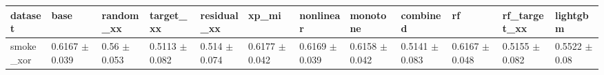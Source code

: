 \begin{tabular}{llllllllllll}
\toprule
dataset & base & random\_xx & target\_xx & residual\_xx & xp\_mi & nonlinear & monotone & combined & rf & rf\_target\_xx & lightgbm \\
\midrule
smoke\_xor & 0.6167 $\pm$ 0.039 & 0.56 $\pm$ 0.053 & 0.5113 $\pm$ 0.082 & 0.514 $\pm$ 0.074 & 0.6177 $\pm$ 0.042 & 0.6169 $\pm$ 0.039 & 0.6158 $\pm$ 0.042 & 0.5141 $\pm$ 0.083 & 0.6167 $\pm$ 0.048 & 0.5155 $\pm$ 0.082 & 0.5522 $\pm$ 0.08 \\
\bottomrule
\end{tabular}
